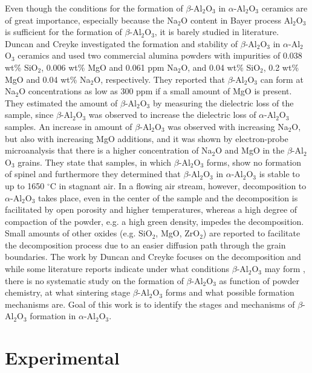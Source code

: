 Even though the conditions for the formation of $\beta$-Al$_{2}$O$_{3}$ in $\alpha$-Al$_{2}$O$_{3}$ ceramics are of great importance, especially because the Na$_{2}$O content in Bayer process Al$_{2}$O$_{3}$ is sufficient for the formation of $\beta$-Al$_{2}$O$_{3}$, it is barely studied in literature. Duncan and Creyke \cite{Duncan1969a} investigated the formation and stability of $\beta$-Al$_{2}$O$_{3}$ in $\alpha$-Al$_{2}$O$_{3}$ ceramics and used two commercial alumina powders with impurities of 0.038 wt\% SiO$_{2}$, 0.006 wt\% MgO and 0.061 ppm Na$_{2}$O, and 0.04 wt\% SiO$_{2}$, 0.2 wt\% MgO and 0.04 wt\% Na$_{2}$O, respectively. They reported that $\beta$-Al$_{2}$O$_{3}$ can form at Na$_{2}$O concentrations as low as 300 ppm if a small amount of MgO is present. They estimated the amount of $\beta$-Al$_{2}$O$_{3}$ by measuring the dielectric loss of the sample, since $\beta$-Al$_{2}$O$_{3}$ was observed to increase the dielectric loss of $\alpha$-Al$_{2}$O$_{3}$ samples. An increase in amount of $\beta$-Al$_{2}$O$_{3}$ was observed with increasing Na$_{2}$O, but also with increasing MgO additions, and it was shown by electron-probe microanalysis that there is a higher concentration of Na$_{2}$O and MgO in the $\beta$-Al$_{2}$O$_{3}$ grains. They state that samples, in which $\beta$-Al$_{2}$O$_{3}$ forms, show no formation of spinel \cite{Duncan1969a} and furthermore they determined that $\beta$-Al$_{2}$O$_{3}$ in $\alpha$-Al$_{2}$O$_{3}$ is stable to up to 1650 $^{\circ}$C in stagnant air. In a flowing air stream, however, decomposition to $\alpha$-Al$_{2}$O$_{3}$ takes place, even in the center of the sample and the decomposition is facilitated by open porosity and higher temperatures, whereas a high degree of compaction of the powder, e.g. a high green density, impedes the decomposition. Small amounts of other oxides (e.g. SiO$_{2}$, MgO, ZrO$_{2}$) are reported to facilitate the decomposition process due to an easier diffusion path through the grain boundaries. The work by Duncan and Creyke focuses on the decomposition and while some literature reports indicate under what conditions $\beta$-Al$_{2}$O$_{3}$ may form \cite{Duncan1969a}, there is no systematic study on the formation of $\beta$-Al$_{2}$O$_{3}$ as function of powder chemistry, at what sintering stage $\beta$-Al$_{2}$O$_{3}$ forms and what possible formation mechanisms are. Goal of this work is to identify the stages and mechanisms of $\beta$-Al$_{2}$O$_{3}$ formation in $\alpha$-Al$_{2}$O$_{3}$.


\section{Experimental}

